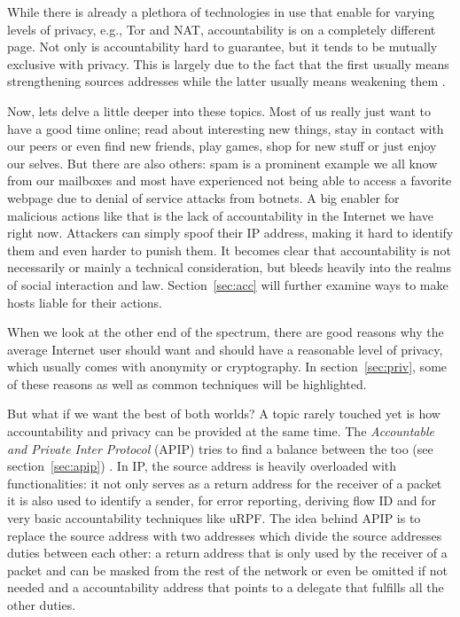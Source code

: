 \documentclass{acm_proc_article-sp}
\begin{document}
While there is already a plethora of technologies in use that enable for varying levels of privacy, e.g., Tor and NAT, accountability is on a completely different page. Not only is accountability hard to guarantee, but it tends to be mutually exclusive with privacy. This is largely due to the fact that the first usually means strengthening sources addresses while the latter usually means weakening them \cite{apip}.

Now, lets delve a little deeper into these topics. Most of us really just want to have a good time online; read about interesting new things, stay in contact with our peers or even find new friends, play games, shop for new stuff or just enjoy our selves. But there are also others: spam is a prominent example we all know from our mailboxes and most have experienced not being able to access a favorite webpage due to denial of service attacks from botnets. A big enabler for malicious actions like that is the lack of accountability in the Internet we have right now. Attackers can simply spoof their IP address, making it hard to identify them and even harder to punish them. It becomes clear that accountability is not necessarily or mainly a technical consideration, but bleeds heavily into the realms of social interaction and law. Section~\ref{sec:acc} will further examine ways to make hosts liable for their actions.

When we look at the other end of the spectrum, there are good reasons why the average Internet user should want and should have a reasonable level of privacy, which usually comes with anonymity or cryptography. In section~\ref{sec:priv}, some of these reasons as well as common techniques will be highlighted.

But what if we want the best of both worlds? A topic rarely touched yet is how accountability and privacy can be provided at the same time. The \emph{Accountable and Private Inter Protocol} (APIP) tries to find a balance between the too (see section~\ref{sec:apip}) \cite{apip}. In IP, the source address is heavily overloaded with functionalities: it not only serves as a return address for the receiver of a packet it is also used to identify a sender, for error reporting, deriving flow ID and for very basic accountability techniques like uRPF. The idea behind APIP is to replace the source address with two addresses which divide the source addresses duties between each other: a return address that is only used by the receiver of a packet and can be masked from the rest of the network or even be omitted if not needed and a accountability address that points to a delegate that fulfills all the other duties.
\end{document}
